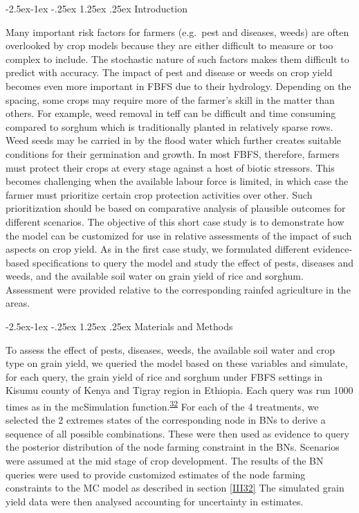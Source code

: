 \documentclass[12pt,oneside]{article}
\makeatletter
\renewcommand\paragraph{\@startsection{paragraph}{4}{\z@}%
            {-2.5ex\@plus -1ex \@minus -.25ex}%
            {1.25ex \@plus .25ex}%
            {\normalfont\normalsize\bfseries}}
\makeatother
\begin{document}
\hypertarget{IV231}{%
\paragraph{Introduction}\label{IV231}}

Many important risk factors for farmers (e.g.~pest and diseases, weeds) are often overlooked by crop models because they are either difficult to measure or too complex to include. The stochastic nature of such factors makes them difficult to predict with accuracy. The impact of pest and disease or weeds on crop yield becomes even more important in FBFS due to their hydrology. Depending on the spacing, some crops may require more of the farmer's skill in the matter than others. For example, weed removal in teff can be difficult and time consuming compared to sorghum which is traditionally planted in relatively sparse rows. Weed seeds may be carried in by the flood water which further creates suitable conditions for their germination and growth. In most FBFS, therefore, farmers must protect their crops at every stage against a host of biotic stressors. This becomes challenging when the available labour force is limited, in which case the farmer must prioritize certain crop protection activities over other. Such prioritization should be based on comparative analysis of plausible outcomes for different scenarios. The objective of this short case study is to demonstrate how the model can be customized for use in relative assessments of the impact of such aspects on crop yield. As in the first case study, we formulated different evidence-based specifications to query the model and study the effect of pests, diseases and weeds, and the available soil water on grain yield of rice and sorghum. Assessment were provided relative to the corresponding rainfed agriculture in the areas.

\hypertarget{IV232}{%
\paragraph{Materials and Methods}\label{IV232}}

To assess the effect of pests, diseases, weeds, the available soil water and crop type on grain yield, we queried the model based on these variables and simulate, for each query, the grain yield of rice and sorghum under FBFS settings in Kisumu county of Kenya and Tigray region in Ethiopia. Each query was run 1000 times as in the mcSimulation function.\textsuperscript{\protect\hyperlink{ref-Luedeling_and_Goehring_2018}{32}} For each of the 4 treatments, we selected the 2 extremes states of the corresponding node in BNs to derive a sequence of all possible combinations. These were then used as evidence to query the posterior distribution of the node farming constraint in the BNs. Scenarios were assumed at the mid stage of crop development. The results of the BN queries were used to provide customized estimates of the node farming constraints to the MC model as described in section \ref{III32} The simulated grain yield data were then analysed accounting for uncertainty in estimates.
\end{document}
